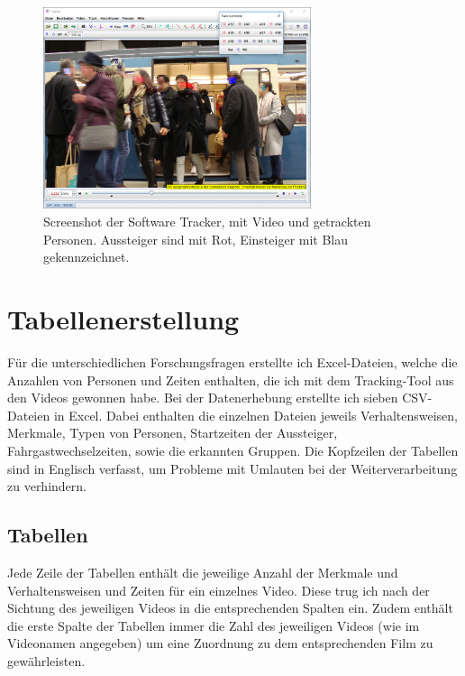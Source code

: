 \begin{figure}[H]
	\centering
		\includegraphics[width=0.7\textwidth]{pictures/data_extraction/tracking/trackExample.png}
	\caption{Screenshot der Software \textsf{Tracker}, mit Video und getrackten Personen. Aussteiger sind mit Rot, Einsteiger mit Blau gekennzeichnet.}
	\label{fig:tracking}
\end{figure}
\section{Tabellenerstellung} \label{Tabellen}
Für die unterschiedlichen Forschungsfragen erstellte ich Excel-Dateien, welche die Anzahlen von Personen und Zeiten enthalten, die ich mit dem Tracking-Tool aus den Videos gewonnen habe. Bei der Datenerhebung erstellte ich sieben CSV-Dateien in Excel. Dabei enthalten die einzelnen Dateien jeweils  Verhaltensweisen, Merkmale, Typen von Personen, Startzeiten der Aussteiger, Fahrgastwechselzeiten, sowie die erkannten Gruppen. Die Kopfzeilen der Tabellen sind in Englisch verfasst, um Probleme mit Umlauten bei der Weiterverarbeitung zu verhindern. 
\subsection{Tabellen}
Jede Zeile der Tabellen enthält die jeweilige Anzahl der Merkmale und Verhaltensweisen und Zeiten für ein einzelnes Video. Diese trug ich nach der Sichtung des jeweiligen Videos in die entsprechenden Spalten ein. Zudem enthält die erste Spalte der Tabellen immer die Zahl des jeweiligen Videos (wie im Videonamen angegeben) um eine Zuordnung zu dem entsprechenden Film zu gewährleisten.
